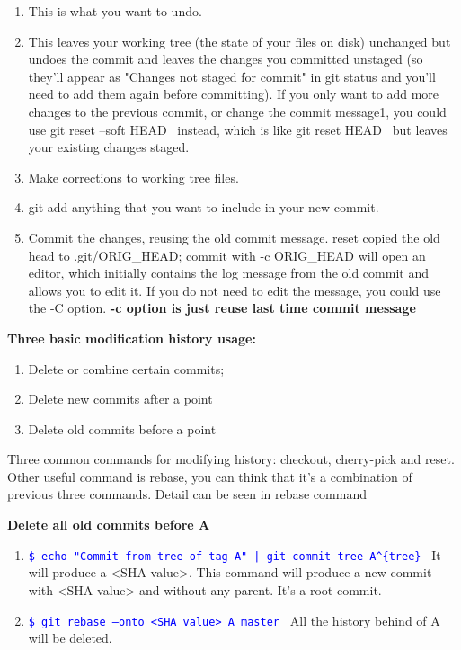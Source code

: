 \documentclass[paper=8.5in:11in, twoside, 12pt, pagesize=pdftex]{book}
\newcommand{\linuxcommand}[1]{\texttt{\textcolor{blue}{\$ #1 \Pisymbol{psy}{191}}}}
\begin{document}
	\begin{enumerate}
		\item This is what you want to undo.
		
		\item This leaves your working tree (the state of your files on disk) unchanged but undoes the commit and leaves the changes you committed unstaged (so they'll appear as "Changes not staged for commit" in git status and you'll need to add them again before committing). If you only want to add more changes to the previous commit, or change the commit message1, you could use git reset --soft HEAD~ instead, which is like git reset HEAD~ but leaves your existing changes staged.
		
		\item Make corrections to working tree files.
		
		\item git add anything that you want to include in your new commit.
		
		\item Commit the changes, reusing the old commit message. reset copied the old head to .git/ORIG\_HEAD; commit with -c ORIG\_HEAD will open an editor, which initially contains the log message from the old commit and allows you to edit it. If you do not need to edit the message, you could use the -C option.  \textbf{-c option is just reuse last time commit message}
	\end{enumerate}
	
	
	
	\textbf{Three basic modification history usage:}
	\begin{enumerate}
		\item Delete or combine certain commits;
		\item Delete new commits after a point
		\item Delete old commits before a point
	\end{enumerate}
	
	Three common commands for modifying history: checkout, cherry-pick and reset. Other useful command is rebase, you can think that it's a combination of previous three commands. Detail can be seen in rebase command
	
	\textbf{Delete all old commits before A} 
	\begin{enumerate}
		\item \linuxcommand{echo "Commit from tree of tag A" | git commit-tree A\^{}\{tree\}}  It will produce a <SHA value>. This command will produce a new commit with <SHA value> and without any parent. It's a root commit. 
		
		\item \linuxcommand{git rebase --onto <SHA value> A master}  All the history behind of A will be deleted. 
	\end{enumerate}
	
\end{document}
